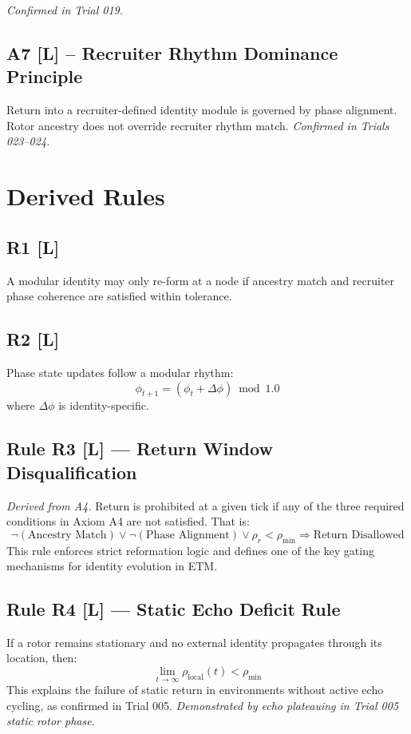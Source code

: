\documentclass[12pt]{article}
\begin{document}
\textit{Confirmed in Trial 019.}

\subsection*{A7 [L] – Recruiter Rhythm Dominance Principle}
Return into a recruiter-defined identity module is governed by phase alignment. Rotor ancestry does not override recruiter rhythm match.
\textit{Confirmed in Trials 023–024.}

\section{Derived Rules}

\subsection*{R1 [L]}
A modular identity may only re-form at a node if ancestry match and recruiter phase coherence are satisfied within tolerance.

\subsection*{R2 [L]}
Phase state updates follow a modular rhythm:
\begin{equation}
\phi_{t+1} = (\phi_t + \Delta\phi) \bmod 1.0
\label{eq:phase_update}
\end{equation}
where $\Delta\phi$ is identity-specific.

\subsection*{Rule R3 [L] — Return Window Disqualification}
\textit{Derived from A4.}  
Return is prohibited at a given tick if any of the three required conditions in Axiom A4 are not satisfied. That is:
\[
\neg(\text{Ancestry Match}) \lor \neg(\text{Phase Alignment}) \lor \rho_r < \rho_{\text{min}} \Rightarrow \text{Return Disallowed}
\]
This rule enforces strict reformation logic and defines one of the key gating mechanisms for identity evolution in ETM.

\subsection*{Rule R4 [L] — Static Echo Deficit Rule}
If a rotor remains stationary and no external identity propagates through its location, then:
\[
\lim_{t \to \infty} \rho_{\text{local}}(t) < \rho_{\text{min}}
\]
This explains the failure of static return in environments without active echo cycling, as confirmed in Trial 005.
\textit{Demonstrated by echo plateauing in Trial 005 static rotor phase.}
\end{document}
